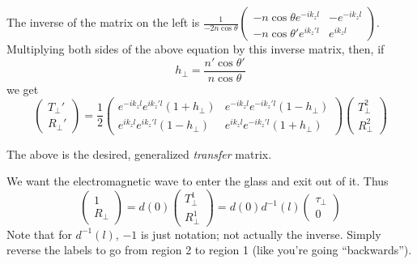 \documentclass[twoside,10pt]{amsart}
\begin{document}
The inverse of the matrix on the left is $\frac{1}{ -2n \cos{\theta} } \left( \begin{matrix} - n \cos{\theta} e^{ -i k_z l } & -e^{ -i k_z l } \\ -n \cos{\theta'} e^{ ik_z' l } &  e^{  i k_z l} \end{matrix} \right)$.  Multiplying both sides of the above equation by this inverse matrix, then, if 
\[
h_{\perp} = \frac{n'\cos{\theta'}}{ n \cos{\theta} } 
\]
we get
\[
\left( \begin{matrix} T_{\perp}' \\ R_{\perp}' \end{matrix} \right) = \frac{1}{2} \left( \begin{matrix} e^{ -ik_z l} e^{i k_z' l} (1+h_{\perp} ) & e^{-ik_z l} e^{-ik_z' l} (1-h_{\perp} ) \\ e^{ik_z l} e^{ik_z'l} (1- h_{\perp}) & e^{ik_zl }e^{-ik_z'l} (1 + h_{\perp}) \end{matrix} \right)\left( \begin{matrix} T_{\perp}^2 \\ R_{\perp}^2 \end{matrix} \right)
\]

The above is the desired, generalized \emph{transfer} matrix.  

We want the electromagnetic wave to enter the glass and exit out of it.  Thus
\[
\left( \begin{matrix} 1 \\ R_{\perp} \end{matrix} \right) = d(0) \left( \begin{matrix} T_{\perp}^1 \\ R_{\perp}^1 \end{matrix} \right) = d(0) d^{-1}(l) \left( \begin{matrix} \tau_{\perp} \\ 0 \end{matrix} \right)
\]
Note that for $d^{-1}(l)$, $-1$ is just notation; not actually the inverse.  Simply reverse the labels to go from region 2 to region 1 (like you're going ``backwards'').  
\end{document}
